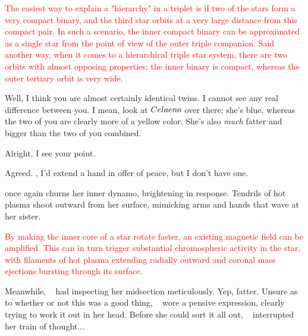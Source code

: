 \documentclass[main.tex]{subfiles}
\begin{document}
\begin{tcolorbox}[sharp corners, colback=red!30, colframe=red!80!blue, title=Orbital Hierarchies]
\par \textcolor{red} {The easiest way to explain a "hierarchy" in a triplet is if two of the stars form a very compact binary, and the third star orbits at a very large distance from this compact pair.  In such a scenario, the inner compact binary can be approximated as a single star from the point of view of the outer triple companion.  Said another way, when it comes to a hierarchical triple star system, there are two orbits with almost opposing properties; the inner binary is compact, whereas the outer tertiary orbit is very wide.}
\end{tcolorbox}

\par \Maia Well, I think you are almost certainly identical twins.  I cannot see any real difference between you.  I mean, look at $Celaeno$ over there; she's blue, whereas the two of you are clearly more of a yellow color.  She's also \textit{much} fatter and bigger than the two of you combined.  

\par \Celaeno Alright, I see your point.

\par \Taygete Agreed.  \rmalcyone, I'd extend a hand in offer of peace, but I don't have one.

\par \nar \rmtaygete once again churns her inner dynamo, brightening in response.  Tendrils of hot plasma shoot outward from her surface, mimicking arms and hands that wave at her sister.

\begin{tcolorbox}[sharp corners, colback=red!30, colframe=red!80!blue, title=Magnetic Fields and Dynamos]
\par \textcolor{red} {By making the inner core of a star rotate faster, an existing magnetic field can be amplified.   This can in turn trigger substantial chromospheric activity in the star, with filaments of hot plasma extending radially outward and coronal mass ejections bursting through its surface.}  
\end{tcolorbox}

\par \nar Meanwhile, \rmcelaeno~ had inspecting her midsection meticulously.  Yep, fatter.  Unsure as to whether or not this was a good thing, \rmcelaeno~ wore a pensive expression, clearly trying to work it out in her head.  Before she could sort it all out, \rmtaygete~ interrupted her train of thought...
\end{document}
